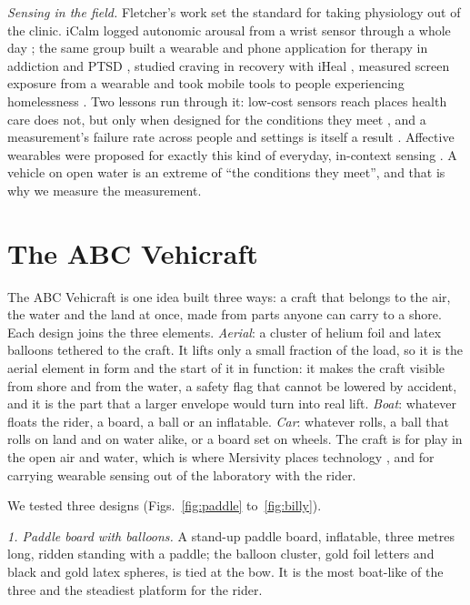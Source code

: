 \documentclass[conference]{IEEEtran}
\begin{document}
\emph{Sensing in the field.} Fletcher's work set the standard for taking physiology out of the clinic. iCalm logged autonomic arousal from a wrist sensor through a whole day \cite{fletcher2010icalm}; the same group built a wearable and phone application for therapy in addiction and PTSD \cite{fletcher2011cbt}, studied craving in recovery with iHeal \cite{boyer2012iheal}, measured screen exposure from a wearable \cite{fletcher2016screentime} and took mobile tools to people experiencing homelessness \cite{leonard2018homeless}. Two lessons run through it: low-cost sensors reach places health care does not, but only when designed for the conditions they meet \cite{fletcher2010wearable, fletcher2014mental}, and a measurement's failure rate across people and settings is itself a result \cite{fletcher2020fairness}. Affective wearables were proposed for exactly this kind of everyday, in-context sensing \cite{picard1997wearables}. A vehicle on open water is an extreme of ``the conditions they meet'', and that is why we measure the measurement.

\section{The ABC Vehicraft}

The ABC Vehicraft is one idea built three ways: a craft that belongs to the air, the water and the land at once, made from parts anyone can carry to a shore. Each design joins the three elements. \emph{Aerial}: a cluster of helium foil and latex balloons tethered to the craft. It lifts only a small fraction of the load, so it is the aerial element in form and the start of it in function: it makes the craft visible from shore and from the water, a safety flag that cannot be lowered by accident, and it is the part that a larger envelope would turn into real lift. \emph{Boat}: whatever floats the rider, a board, a ball or an inflatable. \emph{Car}: whatever rolls, a ball that rolls on land and on water alike, or a board set on wheels. The craft is for play in the open air and water, which is where Mersivity places technology \cite{mann2026float}, and for carrying wearable sensing out of the laboratory with the rider.

We tested three designs (Figs.~\ref{fig:paddle} to~\ref{fig:billy}).

\emph{1. Paddle board with balloons.} A stand-up paddle board, inflatable, three metres long, ridden standing with a paddle; the balloon cluster, gold foil letters and black and gold latex spheres, is tied at the bow. It is the most boat-like of the three and the steadiest platform for the rider.
\end{document}
